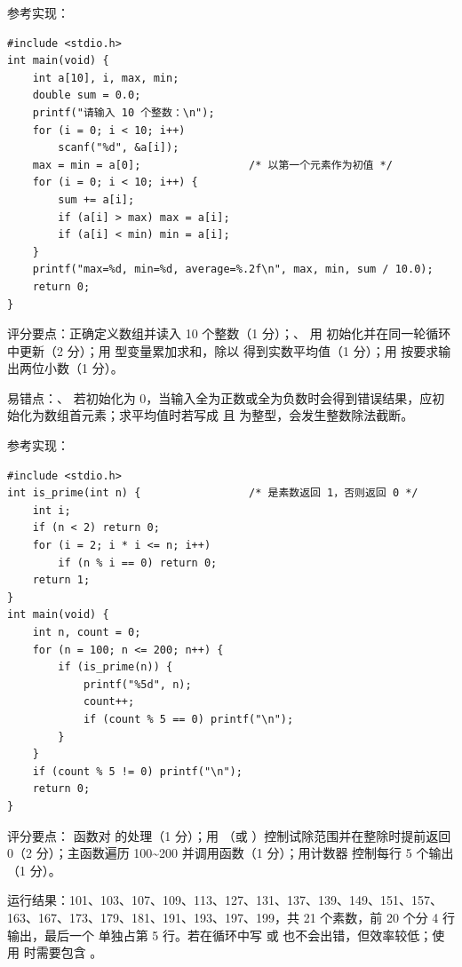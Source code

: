 \documentclass[a4paper,11pt]{article}
\begin{document}
\begin{qgroup}
\q 参考实现：
\begin{lstlisting}[language={[custom]C}]
#include <stdio.h>
int main(void) {
    int a[10], i, max, min;
    double sum = 0.0;
    printf("请输入 10 个整数：\n");
    for (i = 0; i < 10; i++)
        scanf("%d", &a[i]);
    max = min = a[0];                 /* 以第一个元素作为初值 */
    for (i = 0; i < 10; i++) {
        sum += a[i];
        if (a[i] > max) max = a[i];
        if (a[i] < min) min = a[i];
    }
    printf("max=%d, min=%d, average=%.2f\n", max, min, sum / 10.0);
    return 0;
}
\end{lstlisting}
\begin{analysis}
评分要点：正确定义数组并读入 10 个整数（1 分）；、 用  初始化并在同一轮循环中更新（2 分）；用  型变量累加求和，除以  得到实数平均值（1 分）；用  按要求输出两位小数（1 分）。
\end{analysis}
\begin{analysis}
易错点：、 若初始化为 0，当输入全为正数或全为负数时会得到错误结果，应初始化为数组首元素；求平均值时若写成  且  为整型，会发生整数除法截断。
\end{analysis}

\q 参考实现：
\begin{lstlisting}[language={[custom]C}]
#include <stdio.h>
int is_prime(int n) {                 /* 是素数返回 1，否则返回 0 */
    int i;
    if (n < 2) return 0;
    for (i = 2; i * i <= n; i++)
        if (n % i == 0) return 0;
    return 1;
}
int main(void) {
    int n, count = 0;
    for (n = 100; n <= 200; n++) {
        if (is_prime(n)) {
            printf("%5d", n);
            count++;
            if (count % 5 == 0) printf("\n");
        }
    }
    if (count % 5 != 0) printf("\n");
    return 0;
}
\end{lstlisting}
\begin{analysis}
评分要点： 函数对  的处理（1 分）；用 （或 ）控制试除范围并在整除时提前返回 0（2 分）；主函数遍历 100\textasciitilde 200 并调用函数（1 分）；用计数器  控制每行 5 个输出（1 分）。
\end{analysis}
\begin{analysis}
运行结果：101、103、107、109、113、127、131、137、139、149、151、157、163、167、173、179、181、191、193、197、199，共 21 个素数，前 20 个分 4 行输出，最后一个  单独占第 5 行。若在循环中写  或  也不会出错，但效率较低；使用  时需要包含 。
\end{analysis}
\end{qgroup}
\end{document}

